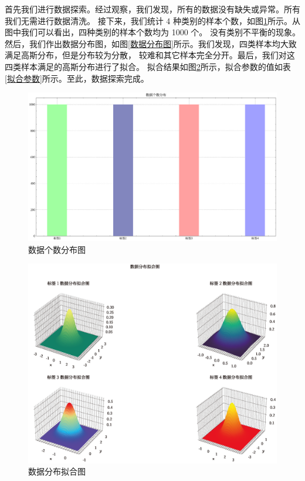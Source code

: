 \documentclass[supercite]{Experimental_Report}
\theoremstyle{definition}
\begin{document}
首先我们进行数据探索。经过观察，我们发现，所有的数据没有缺失或异常。所有我们无需进行数据清洗。
接下来，我们统计 4 种类别的样本个数，如图\ref{数据个数分布图}所示。从图中我们可以看出，四种类别的样本个数均为 1000 个。
没有类别不平衡的现象。然后，我们作出数据分布图，如图\ref{数据分布图}所示。我们发现，四类样本均大致满足高斯分布，但是分布较为分散，
较难和其它样本完全分开。最后，我们对这四类样本满足的高斯分布进行了拟合。
拟合结果如图\ref{数据分布拟合图}所示，拟合参数的值如表\ref{拟合参数}所示。至此，数据探索完成。
\begin{figure}[H]
	\begin{center}
		\includegraphics[scale=0.30]{../images/数据个数分布图.pdf}
		\caption{数据个数分布图}
		\label{数据个数分布图}
	\end{center}
\end{figure}
\begin{figure}[H]
	\begin{center}
		\includegraphics[scale=0.35]{../images/数据分布拟合图.png}
		\caption{数据分布拟合图}
		\label{数据分布拟合图}
	\end{center}
\end{figure}
\end{document}
